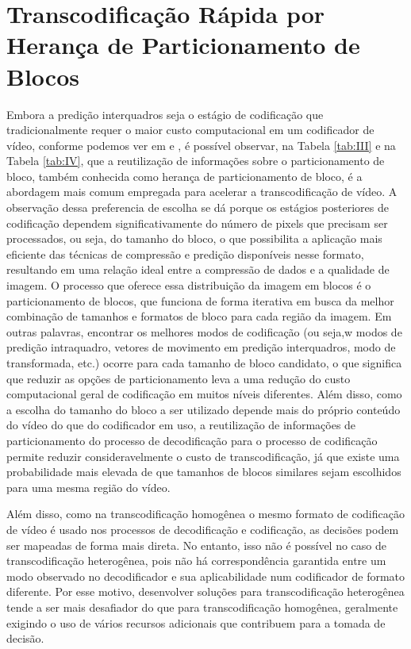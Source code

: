 \section{Transcodificação Rápida por Herança de Particionamento de Blocos}
\label{cap:3.3}

Embora a predição interquadros seja o estágio de codificação que tradicionalmente requer o maior custo computacional em um codificador de vídeo, conforme podemos ver em \citet{bib:zrida_2011} e \citet{bib:siqueira_2020}, é possível observar, na Tabela \ref{tab:III} e na Tabela \ref{tab:IV}, que a reutilização de informações sobre o particionamento de bloco, também conhecida como herança de particionamento de bloco, é a abordagem mais comum empregada para acelerar a transcodificação de vídeo. A observação dessa preferencia de escolha se dá porque os estágios posteriores de codificação dependem significativamente do número de pixels que precisam ser processados, ou seja, do tamanho do bloco, o que possibilita a aplicação mais eficiente das técnicas de compressão e predição disponíveis nesse formato, resultando em uma relação ideal entre a compressão de dados e a qualidade de imagem. O processo que oferece essa distribuição da imagem em blocos é o particionamento de blocos, que funciona de forma iterativa em busca da melhor combinação de tamanhos e formatos de bloco para cada região da imagem. Em outras palavras, encontrar os melhores modos de codificação (ou seja,w modos de predição intraquadro, vetores de movimento em predição interquadros, modo de transformada, etc.) ocorre para cada tamanho de bloco candidato, o que significa que reduzir as opções de particionamento leva a uma redução do custo computacional geral de codificação em muitos níveis diferentes. Além disso, como a escolha do tamanho do bloco a ser utilizado depende mais do próprio conteúdo do vídeo do que do codificador em uso, a reutilização de informações de particionamento do processo de decodificação para o processo de codificação permite reduzir consideravelmente o custo de transcodificação, já que existe uma probabilidade mais elevada de que tamanhos de blocos similares sejam escolhidos para uma mesma região do vídeo.

Além disso, como na transcodificação homogênea o mesmo formato de codificação de vídeo é usado nos processos de decodificação e codificação, as decisões podem ser mapeadas de forma mais direta. No entanto, isso não é possível no caso de transcodificação heterogênea, pois não há correspondência garantida entre um modo observado no decodificador e sua aplicabilidade num codificador de formato diferente. Por esse motivo, desenvolver soluções para transcodificação heterogênea tende a ser mais desafiador do que para transcodificação homogênea, geralmente exigindo o uso de vários recursos adicionais que contribuem para a tomada de decisão.

